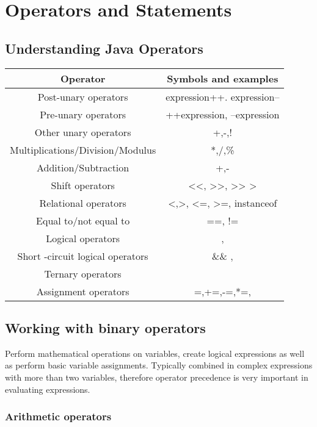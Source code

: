 \documentclass[a4paper]{report}   %
\begin{document}
\chapter{Operators and Statements}

\section{Understanding Java Operators}



\begin{center}
\begin{tabular}{| c | c |}
 \hline
 Operator & Symbols and examples\\
 \hline
 Post-unary operators & expression++. expression--\\
 Pre-unary operators & ++expression, --expression\\
 Other unary operators & +,-,! \\
 Multiplications/Division/Modulus & *,/,\% \\ 
 Addition/Subtraction & +,- \\
 Shift operators & <<, >>, >> >\\
 Relational operators & <,>, <=, >=, instanceof \\
 Equal to/not equal to & ==, != \\
 Logical operators &  , \\
 Short -circuit logical operators & \&\& , \\
 Ternary operators & 
\\

 Assignment operators & =,+=,-=,*=,%
 \\
 \hline
\end{tabular}
\end{center}

\section{Working with binary operators}
Perform mathematical operations on variables, create logical expressions as well as perform basic variable assignments. Typically combined in complex expressions with more than two variables, therefore operator precedence is very important in evaluating expressions.

\subsection{Arithmetic operators}
\end{document}

